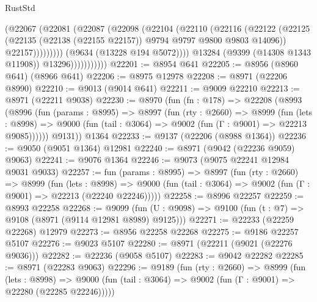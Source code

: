 \begin{lexlean}{RustStd}
\begin{coremodule}
                                (@22067
                                  (@22081
                                    (@22087
                                      (@22098
                                        (@22104
                                          (@22110
                                            (@22116
                                              (@22122
                                                (@22125
                                                  (@22135
                                                    (@22138 (@22155 @22157))
                                                    @9794
                                                    @9797
                                                    @9800
                                                    @9803
                                                    @14096))
                                                @22157)))))))))
                              (@9634 (@13228 @194 @5072))))
                          @13284
                          (@9399 (@14308 @1343 @11908))
                          @13296)))))))))))
@22201 := @8954 @641
@22205 := @8956 (@8960 @641) (@8966 @641)
@22206 := @8975 @12978
@22208 := @8971 (@22206 @8990)
@22210 := @9013 (@9014 @641)
@22211 := @9009 @22210
@22213 := @8971 (@22211 @9038)
@22230 := @8970
    (fun (fn : @178) =>
    @22208
      (@8993
        (@8996
          (fun (params : @8995) =>
          @8997
            (fun (rty : @2660) =>
            @8999
              (fun (lets : @8998) =>
              @9000 (fun (tail : @3064) => @9002 (fun (Γ : @9001) => @22213 @9085))))))
        @9131))
    @1364
@22233 := @9137 (@22206 (@8988 @1364))
@22236 := @9050 (@9051 @1364) @12981
@22240 := @8971 (@9042 (@22236 @9059) @9063)
@22241 := @9076 @1364
@22246 := @9073 (@9075 @22241 @12984 @9031 @9033)
@22257 := fun (params : @8995) =>
  @8997
    (fun (rty : @2660) =>
    @8999
      (fun (lets : @8998) =>
      @9000 (fun (tail : @3064) => @9002 (fun (Γ : @9001) => @22213 (@22240 @22246)))))
@22258 := @8996 @22257
@22259 := @8993 @22258
@22268 := @9099
    (fun (U : @9098) => @9100 (fun (t : @7) => @9108 (@8971 (@9114 @12981 @8989) @9125)))
@22271 := @22233 (@22259 @22268) @12979
@22273 := @8956 @22258 @22268
@22275 := @9186 @22257 @5107
@22276 := @9023 @5107
@22280 := @8971 (@22211 (@9021 (@22276 @9036)))
@22282 := @22236 (@9058 @5107)
@22283 := @9042 @22282
@22285 := @8971 (@22283 @9063)
@22296 := @9189
    (fun (rty : @2660) =>
    @8999
      (fun (lets : @8998) =>
      @9000 (fun (tail : @3064) => @9002 (fun (Γ : @9001) => @22280 (@22285 @22246)))))

\end{coremodule}
\end{lexlean}
